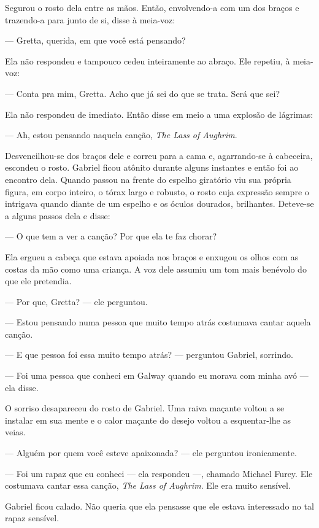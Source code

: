Segurou o rosto dela entre as mãos.  Então, envolvendo-a com um dos braços e
trazendo-a para junto de si, disse à meia-voz:

--- Gretta, querida, em que você está pensando?

Ela não respondeu e tampouco cedeu inteiramente ao abraço.  Ele repetiu, à meia-voz:

--- Conta pra mim, Gretta.  Acho que já sei do que se trata.  Será que sei?

Ela não respondeu de imediato.  Então disse em meio a uma explosão de lágrimas:

--- Ah, estou pensando naquela canção, \textit{The Lass of Aughrim}.  

Desvencilhou-se dos braços dele e correu para a cama e, agarrando-se à
cabeceira, escondeu o rosto.  Gabriel ficou atônito durante alguns instantes e
então foi ao encontro dela.  Quando passou na frente do espelho giratório viu
sua própria figura, em corpo inteiro, o tórax largo e robusto, o rosto cuja
expressão sempre o intrigava quando diante de um espelho e os óculos dourados,
brilhantes.  Deteve-se a alguns passos dela e disse:

--- O que tem a ver a canção?  Por que ela te faz chorar?

Ela ergueu a cabeça que estava apoiada nos braços e enxugou os olhos com as
costas da mão como uma criança.  A voz dele assumiu um tom mais benévolo do que
ele pretendia.

--- Por que, Gretta? --- ele perguntou.

--- Estou pensando numa pessoa que muito tempo atrás costumava cantar aquela
canção.

--- E que pessoa foi essa muito tempo atrás? --- perguntou Gabriel, sorrindo.

--- Foi uma pessoa que conheci em Galway quando eu morava com minha avó --- ela
disse.

O sorriso desapareceu do rosto de Gabriel.  Uma raiva maçante voltou a se
instalar em sua mente e o calor maçante do desejo voltou a esquentar-lhe as
veias.

--- Alguém por quem você esteve apaixonada? --- ele perguntou ironicamente.

--- Foi um rapaz que eu conheci --- ela respondeu ---, chamado Michael Furey.
Ele costumava cantar essa canção, \textit{The Lass of Aughrim}.  Ele era muito
sensível.

Gabriel ficou calado.  Não queria que ela pensasse que ele estava interessado
no tal rapaz sensível.

